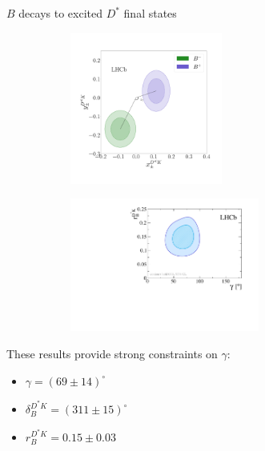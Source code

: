 \documentclass[xcolor={dvipsnames}]{beamer}
\begin{document}
\begin{frame}{$B$ decays to excited $D^*$ final states}
  \begin{figure}
    \centering
    \begin{subfigure}{0.5\textwidth}
      \centering
      \includegraphics[height=5.0cm]{Plots/xyfinalres_BtoDstK.pdf}
    \end{subfigure}%
    \begin{subfigure}{0.5\textwidth}
      \centering
      \includegraphics[height=4.4cm]{Plots/cartesian_cartesian1_g_r_dk_BtoDstK.pdf}
    \end{subfigure}
  \end{figure}
  \vspace{-1.0cm}
  \begin{center}
    These results provide strong constraints on $\gamma$:
  \end{center}
  \begin{itemize}
  \item{$\gamma = (69 \pm 14)^\circ$}
  \item{$\delta_B^{D^*K} = (311 \pm 15)^\circ$}
  \item{$r_B^{D^*K} = 0.15 \pm 0.03$}
  \end{itemize}
\end{frame}
\end{document}
